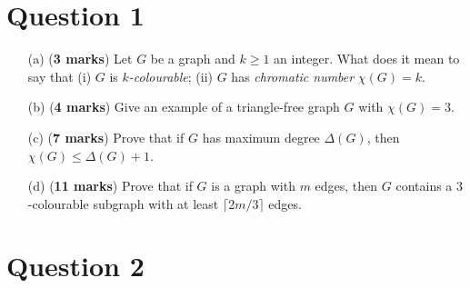 \documentclass[11pt]{article}
\begin{document}




\newpage
{}
\section*{Question 1}

\begin{enumerate}
    \item[(a)] (\textbf{3 marks}) Let $G$ be a graph and $k \geq 1$ an integer. What does it mean to say that (i) $G$ is \textit{$k$-colourable}; (ii) $G$ has \textit{chromatic number} $\chi(G) = k$.
    \item[(b)] (\textbf{4 marks}) Give an example of a triangle-free graph $G$ with $\chi(G) = 3$. 
    \item[(c)] (\textbf{7 marks}) Prove that if $G$ has maximum degree $\Delta(G)$, then $\chi(G) \leq \Delta(G) + 1$.
    \item[(d)] (\textbf{11 marks}) Prove that if $G$ is a graph with $m$ edges, then $G$ contains a $3$-colourable subgraph with at least $\lceil 2m / 3\rceil$ edges.
\end{enumerate}

\section*{Question 2}
\end{document}
